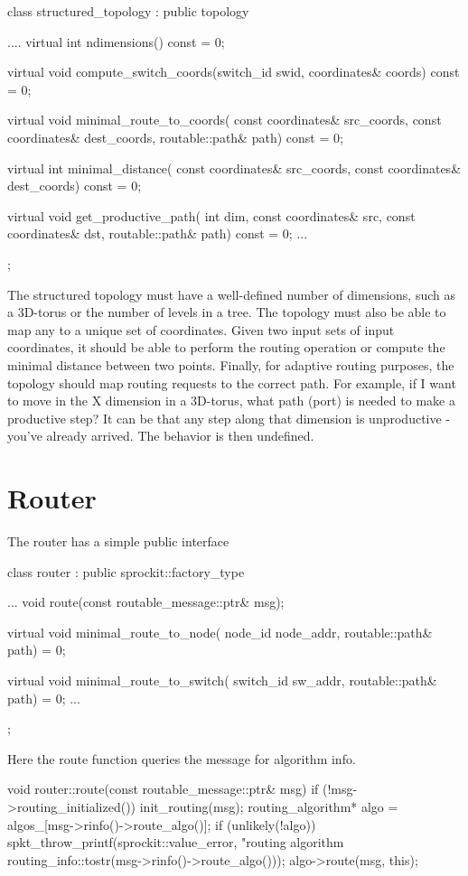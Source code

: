 \begin{CppCode}
class structured_topology :
  public topology
{
  ....
  virtual int
  ndimensions() const = 0;	

  virtual void
  compute_switch_coords(switch_id swid, coordinates& coords) const = 0;

  virtual void
  minimal_route_to_coords(
    const coordinates& src_coords,
    const coordinates& dest_coords,
    routable::path& path) const = 0;

  virtual int
  minimal_distance(
    const coordinates& src_coords,
    const coordinates& dest_coords) const = 0;

  virtual void
  get_productive_path(
    int dim,
    const coordinates& src,
    const coordinates& dst,
    routable::path& path) const = 0;
  ...
};
\end{CppCode}
The structured topology must have a well-defined number of dimensions, such as a 3D-torus or the number of levels in a tree.
The topology must also be able to map any \switchid to a unique set of coordinates.
Given two input sets of input coordinates, it should be able to perform the routing operation or compute the minimal distance between two points.
Finally, for adaptive routing purposes, the topology should map routing requests to the correct path.
For example, if I want to move in the X dimension in a 3D-torus, what path (port) is needed to make a productive step?
It can be that any step along that dimension is unproductive - you've already arrived.
The behavior is then undefined.

\section{Router}\label{sec:router}
The router has a simple public interface

\begin{CppCode}
class router :
  public sprockit::factory_type
{
...
  void
  route(const routable_message::ptr& msg);

  virtual void
  minimal_route_to_node(
    node_id node_addr,
    routable::path& path) = 0;
    
  virtual void
  minimal_route_to_switch(
    switch_id sw_addr,
    routable::path& path) = 0;
...
};
\end{CppCode}

Here the route function queries the message for algorithm info.

\begin{CppCode}
void
router::route(const routable_message::ptr& msg)
{
  if (!msg->routing_initialized()) {
    init_routing(msg);
  }
  routing_algorithm* algo = algos_[msg->rinfo()->route_algo()];
  if (unlikely(!algo)) {
    spkt_throw_printf(sprockit::value_error,
                     "routing algorithm %
                     routing_info::tostr(msg->rinfo()->route_algo()));
  }
  algo->route(msg, this);
}
\end{CppCode}

